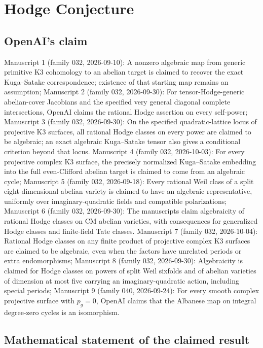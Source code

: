 \documentclass[11pt]{article}
\begin{document}
\section*{Hodge Conjecture}

\subsection{OpenAI's claim}
Manuscript 1 (family 032, 2026-09-10): A nonzero algebraic map from generic primitive K3 cohomology to an abelian target is claimed to recover the exact Kuga--Satake correspondence; existence of that starting map remains an assumption; Manuscript 2 (family 032, 2026-09-30): For tensor-Hodge-generic abelian-cover Jacobians and the specified very general diagonal complete intersections, OpenAI claims the rational Hodge assertion on every self-power; Manuscript 3 (family 032, 2026-09-30): On the specified quadratic-lattice locus of projective K3 surfaces, all rational Hodge classes on every power are claimed to be algebraic; an exact algebraic Kuga--Satake tensor also gives a conditional criterion beyond that locus. Manuscript 4 (family 032, 2026-10-03): For every projective complex K3 surface, the precisely normalized Kuga--Satake embedding into the full even-Clifford abelian target is claimed to come from an algebraic cycle; Manuscript 5 (family 032, 2026-09-18): Every rational Weil class of a split eight-dimensional abelian variety is claimed to have an algebraic representative, uniformly over imaginary-quadratic fields and compatible polarizations; Manuscript 6 (family 032, 2026-09-30): The manuscripts claim algebraicity of rational Hodge classes on CM abelian varieties, with consequences for generalized Hodge classes and finite-field Tate classes. Manuscript 7 (family 032, 2026-10-04): Rational Hodge classes on any finite product of projective complex K3 surfaces are claimed to be algebraic, even when the factors have unrelated periods or extra endomorphisms; Manuscript 8 (family 032, 2026-09-30): Algebraicity is claimed for Hodge classes on powers of split Weil sixfolds and of abelian varieties of dimension at most five carrying an imaginary-quadratic action, including special periods; Manuscript 9 (family 040, 2026-09-24): For every smooth complex projective surface with $p_g=0$, OpenAI claims that the Albanese map on integral degree-zero cycles is an isomorphism.

\subsection{Mathematical statement of the claimed result}
\end{document}
